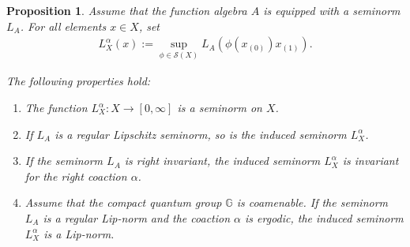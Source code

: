 \documentclass{amsart}
\theoremstyle{plain}
\newtheorem{proposition}[theorem]{Proposition}
\theoremstyle{definition}
\theoremstyle{remark}
\begin{document}
	\begin{proposition}\label{prop:Li-Thm-1.4}
		Assume that the function algebra $A$ is equipped with a seminorm $L_A$.
		For all elements $x \in X$, set
		\begin{align}\label{eqn:Induced-Lip-norm}
			L_X^\alpha(x) 
			:= \sup_{\phi \in \mathcal{S}(X)} L_A(\phi(x_{(0)})x_{(1)}).
		\end{align}
		
		The following properties hold:
		\begin{enumerate}
			\item The function $L_X^\alpha : X \rightarrow [0,\infty]$ is a seminorm on $X$.
			\item If $L_A$ is a regular Lipschitz seminorm, so is the induced  seminorm $L_X^\alpha$.
			\item If the seminorm $L_A$ is right invariant, the induced seminorm $L_X^\alpha$ is invariant for the right coaction $\alpha$.
			\item Assume that the compact quantum group $\mathbb{G}$ is coamenable.
			If the seminorm $L_A$ is a regular Lip-norm and the coaction $\alpha$ is ergodic, the induced seminorm $L_X^\alpha$ is a Lip-norm.
		\end{enumerate}
	\end{proposition}
	
\end{document}
